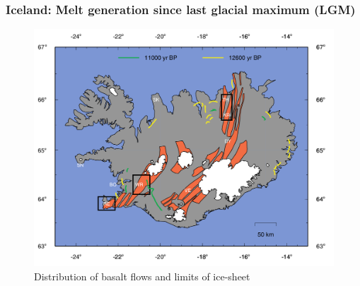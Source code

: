\documentclass[aspectratio=169]{beamer}
\begin{document}
\begin{frame}
    \frametitle{Iceland: Melt generation since last glacial maximum (LGM)}
    \begin{figure}
        \includegraphics[height=.65\paperheight]{./figures/iceland-map.png}
        \caption{Distribution of basalt flows and limits of ice-sheet \citep{maclennan-etal-2002}}
    \end{figure}
\end{frame}
\end{document}
